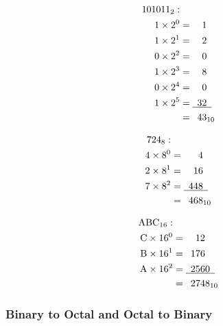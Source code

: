 \begin{multicols}{3}

  \begin{align*}
    {101011}_{2} : & \\
    1 \times 2 ^ 0 &=             \hphantom{00}1             \\
    1 \times 2 ^ 1 &=             \hphantom{00}2             \\
    0 \times 2 ^ 2 &=             \hphantom{00}0             \\
    1 \times 2 ^ 3 &=             \hphantom{00}8             \\
    0 \times 2 ^ 4 &=             \hphantom{00}0             \\
    1 \times 2 ^ 5 &= \underline{\hphantom{0}32\hphantom{0}} \\
                   &=           {\hphantom{0}43}_{10}        \\
  \end{align*}

  \columnbreak

  \begin{align*}
    {724}_{8} : & \\
    4 \times 8 ^ 0 &=            \hphantom{000}4              \\
    2 \times 8 ^ 1 &=            \hphantom{00}16              \\
    7 \times 8 ^ 2 &= \underline{\hphantom{0}448\hphantom{0}} \\
                   &=           {\hphantom{0}468}_{10}        \\
  \end{align*}

  \columnbreak

  \begin{align*}
    \text{ABC}_{16} : & \\
    \text{C} \times 16 ^ 0 &=             \hphantom{00}12              \\
    \text{B} \times 16 ^ 1 &=             \hphantom{0}176              \\
    \text{A} \times 16 ^ 2 &= \underline{\hphantom{0}2560\hphantom{0}} \\
                           &=           {\hphantom{0}2748}_{10}        \\
  \end{align*}
\end{multicols}

\clearpage

\subsubsection{Binary to Octal and Octal to Binary}

